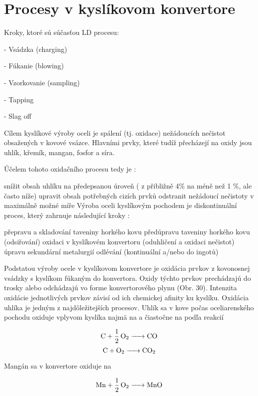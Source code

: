 \section{Procesy v kyslíkovom konvertore}

Kroky, ktoré sú súčasťou LD procesu:

- Vsádzka (charging)

- Fúkanie (blowing)

- Vzorkovanie (sampling)

- Tapping

- Slag off


Cílem kyslíkové výroby oceli je spálení (tj. oxidace) nežádoucích nečistot obsažených v kovové vsázce. Hlavními prvky, které tudíž přecházejí na oxidy jsou uhlík, křemík, mangan, fosfor a síra.

Účelem tohoto oxidačního procesu tedy je :

snížit obsah uhlíku na předepsanou úroveň ( z přibližně 4\% na méně než 1 \%, ale často níže)
upravit obsah potřebných cizích prvků
odstranit nežádoucí nečistoty v maximálně možné míře
Výroba oceli kyslíkovým pochodem je diskontinuální proces, který zahrnuje následující kroky :

přepravu a skladování taveniny horkého kovu
předúpravu taveniny horkého kovu (odsiřování)
oxidaci v kyslíkovém konvertoru (oduhličení a oxidaci nečistot)
úpravu sekundární metalurgií
odlévání (kontinuální a/nebo do ingotů)


Podstatou výroby ocele v kyslíkovom konvertore je oxidácia prvkov z kovonosnej vsádzky s kyslíkom fúkaným do konvertora. Oxidy týchto prvkov prechádzajú do trosky alebo odchádzajú vo forme konvertorového plynu (Obr. 30). Intenzita oxidácie jednotlivých prvkov závisí od ich chemickej afinity ku kyslíku.
Oxidácia uhlíka je jedným z najdôležitejších procesov. Uhlík sa v kove počas
oceliarenského pochodu oxiduje vplyvom kyslíka najmä na  a čiastočne na  podľa reakcií

\begin{equation}
\ce{C + 1/2O2 -> CO}
\end{equation}
\begin{equation}
\ce{C + O2 -> CO2}
\end{equation}

Mangán sa v konvertore oxiduje na 

\begin{equation}
\ce{Mn + 1/2O2 -> MnO}
\end{equation}

